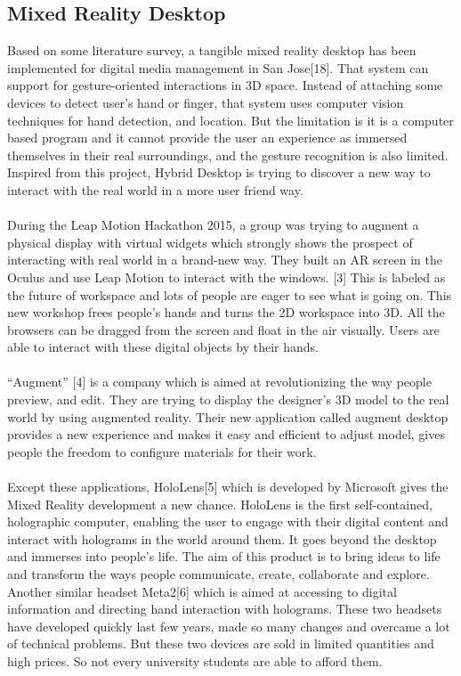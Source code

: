 \subsection{Mixed Reality Desktop}
Based on some literature survey, a tangible mixed reality desktop has been implemented for digital media management in San Jose[18]. That system can support for gesture-oriented interactions in 3D space. Instead of attaching some devices to detect user’s hand or finger, that system uses computer vision techniques for hand detection, and location. But the limitation is it is a computer based program and it cannot provide the user an experience as immersed themselves in their real surroundings, and the gesture recognition is also limited. Inspired from this project, Hybrid Desktop is trying to discover a new way to interact with the real world in a more user friend way.
\\
\\
During the Leap Motion Hackathon 2015, a group was trying to augment a physical display with virtual widgets which strongly shows the prospect of interacting with real world in a brand-new way. They built an AR screen in the Oculus and use Leap Motion to interact with the windows. [3] This is labeled as the future of workspace and lots of people are eager to see what is going on. This new workshop frees people’s hands and turns the 2D workspace into 3D. All the browsers can be dragged from the screen and float in the air visually. Users are able to interact with these digital objects by their hands. 
\\
\\ 
“Augment” [4] is a company which is aimed at revolutionizing the way people preview, and edit. They are trying to display the designer’s 3D model to the real world by using augmented reality. Their new application called augment desktop provides a new experience and makes it easy and efficient to adjust model, gives people the freedom to configure materials for their work.
\\
\\
Except these applications, HoloLens[5] which is developed by Microsoft gives the Mixed Reality development a new chance. HoloLens is the first self-contained, holographic computer, enabling the user to engage with their digital content and interact with holograms in the world around them. It goes beyond the desktop and immerses into people’s life. The aim of this product is to bring ideas to life and transform the ways people communicate, create, collaborate and explore. Another similar headset Meta2[6] which is aimed at accessing to digital information and directing hand interaction with holograms. These two headsets have developed quickly last few years, made so many changes and overcame a lot of technical problems. But these two devices are sold in limited quantities and high prices. So not every university students are able to afford them.

